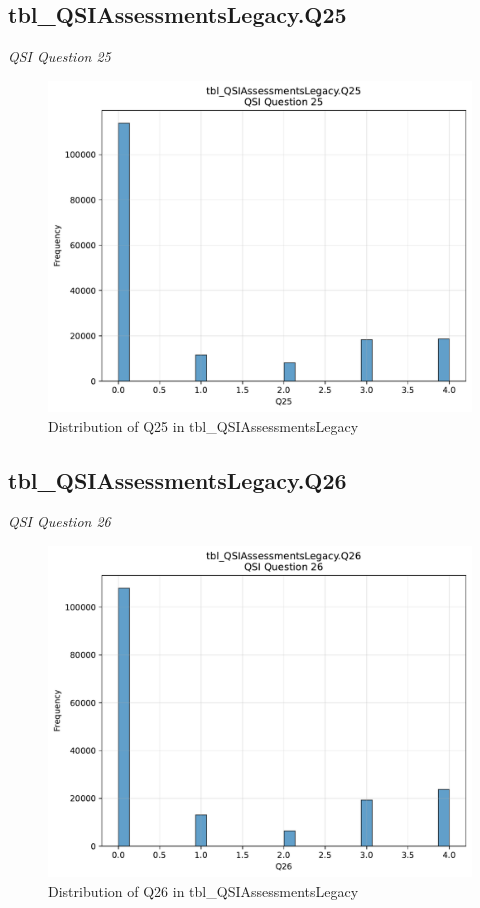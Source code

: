 \subsection{tbl\_QSIAssessmentsLegacy.Q25}
\textit{QSI Question 25}

\begin{figure}[htbp]
\centering
\includegraphics[width=\textwidth]{figures/dbo_tbl_QSIAssessmentsLegacy_Q25.pdf}
\caption{Distribution of Q25 in tbl\_QSIAssessmentsLegacy}
\end{figure}\newpage

\subsection{tbl\_QSIAssessmentsLegacy.Q26}
\textit{QSI Question 26}

\begin{figure}[htbp]
\centering
\includegraphics[width=\textwidth]{figures/dbo_tbl_QSIAssessmentsLegacy_Q26.pdf}
\caption{Distribution of Q26 in tbl\_QSIAssessmentsLegacy}
\end{figure}\newpage

